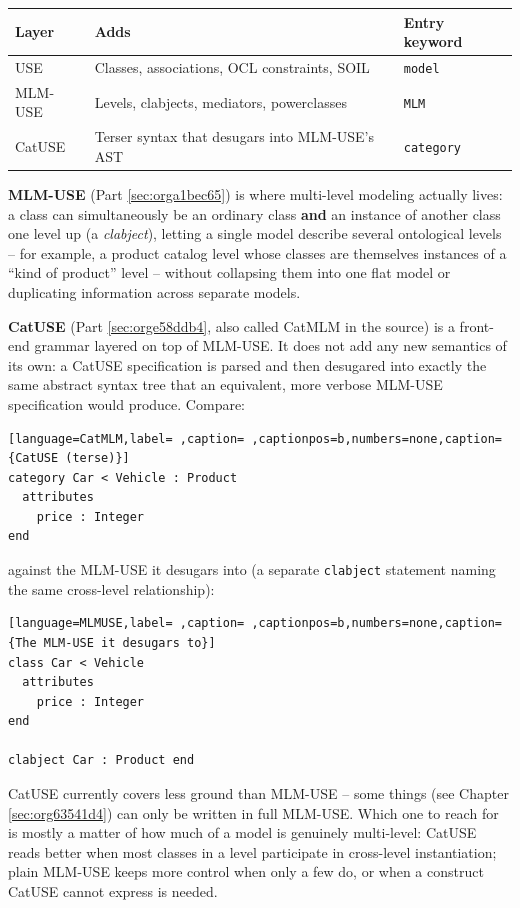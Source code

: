 \documentclass[11pt,twoside,a4paper]{book}
\begin{document}
\begin{center}
\begin{tabular}{lp{7cm}l}
Layer & Adds & Entry keyword\\[0pt]
\hline
USE & Classes, associations, OCL constraints, SOIL & \texttt{model}\\[0pt]
MLM-USE & Levels, clabjects, mediators, powerclasses & \texttt{MLM}\\[0pt]
CatUSE & Terser syntax that desugars into MLM-USE's AST & \texttt{category}\\[0pt]
\end{tabular}
\end{center}

\textbf{MLM-USE} (Part \ref{sec:orga1bec65}) is where multi-level modeling
actually lives: a class can simultaneously be an ordinary class \textbf{and}
an instance of another class one level up (a \emph{clabject}), letting a
single model describe several ontological levels -- for example, a
product catalog level whose classes are themselves instances of a
``kind of product'' level -- without collapsing them into one flat
model or duplicating information across separate models.

\textbf{CatUSE} (Part \ref{sec:orge58ddb4}, also called CatMLM in the source) is a
front-end grammar layered on top of MLM-USE. It does not add any new
semantics of its own: a CatUSE specification is parsed and then
desugared into exactly the same abstract syntax tree that an
equivalent, more verbose MLM-USE specification would produce. Compare:

\begin{lstlisting}[language=CatMLM,label= ,caption= ,captionpos=b,numbers=none,caption={CatUSE (terse)}]
category Car < Vehicle : Product
  attributes
    price : Integer
end
\end{lstlisting}

against the MLM-USE it desugars into (a separate \texttt{clabject} statement
naming the same cross-level relationship):

\begin{lstlisting}[language=MLMUSE,label= ,caption= ,captionpos=b,numbers=none,caption={The MLM-USE it desugars to}]
class Car < Vehicle
  attributes
    price : Integer
end

clabject Car : Product end
\end{lstlisting}

CatUSE currently covers less ground than MLM-USE -- some things (see
Chapter \ref{sec:org63541d4}) can only be written in full
MLM-USE. Which one to reach for is mostly a matter of how much of a
model is genuinely multi-level: CatUSE reads better when most classes
in a level participate in cross-level instantiation; plain MLM-USE
keeps more control when only a few do, or when a construct CatUSE
cannot express is needed.
\end{document}
